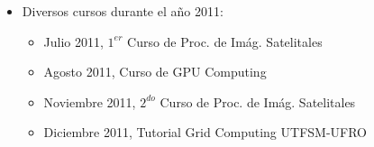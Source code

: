 \frame
{
\frametitle{}

\begin{columns}
\begin{itemize}
\item Diversos cursos durante el año 2011:
\begin{itemize}
\item Julio 2011, $1^{er}$ Curso de Proc. de Imág. Satelitales
\item Agosto 2011, Curso de GPU Computing
\item Noviembre 2011, $2^{do}$ Curso de Proc. de Imág. Satelitales
\item Diciembre 2011, Tutorial Grid Computing UTFSM-UFRO
\end{itemize}
\end{itemize}
\end{columns}

}



